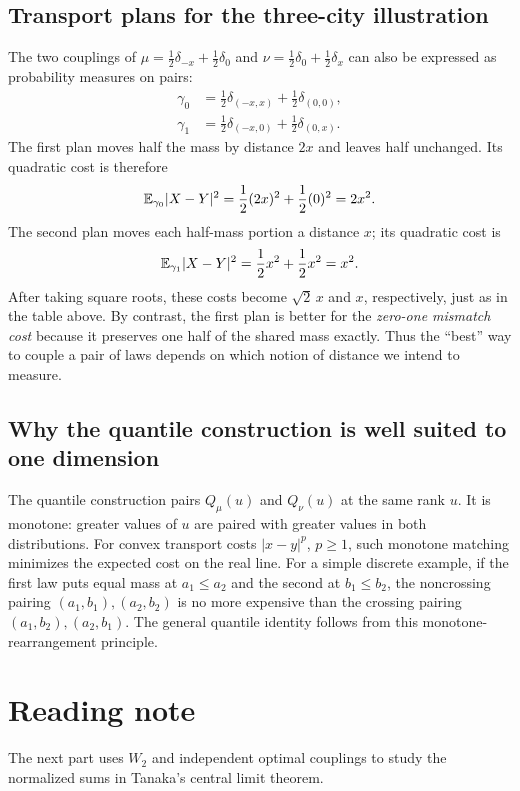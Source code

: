 \documentclass[10pt,a4paper]{article}
\begin{document}
\subsection*{Transport plans for the three-city illustration}
The two couplings of $\mu=\frac12\delta_{-x}+\frac12\delta_0$ and $\nu=\frac12\delta_0+\frac12\delta_x$ can also be expressed as probability measures on pairs:
\begin{align*}
\gamma_0&=\tfrac12\delta_{(-x,x)}+\tfrac12\delta_{(0,0)},\\
\gamma_1&=\tfrac12\delta_{(-x,0)}+\tfrac12\delta_{(0,x)}.
\end{align*}
The first plan moves half the mass by distance $2x$ and leaves half unchanged. Its quadratic cost is therefore
\[
\mathbb E_{\gamma_0}|X-Y|^2
=\frac12(2x)^2+\frac12(0)^2=2x^2.
\]
The second plan moves each half-mass portion a distance $x$; its quadratic cost is
\[
\mathbb E_{\gamma_1}|X-Y|^2
=\frac12x^2+\frac12x^2=x^2.
\]
After taking square roots, these costs become $\sqrt2\,x$ and $x$, respectively, just as in the table above. By contrast, the first plan is better for the \emph{zero-one mismatch cost} because it preserves one half of the shared mass exactly. Thus the ``best'' way to couple a pair of laws depends on which notion of distance we intend to measure.

\subsection*{Why the quantile construction is well suited to one dimension}
The quantile construction pairs $Q_\mu(u)$ and $Q_\nu(u)$ at the same rank $u$. It is monotone: greater values of $u$ are paired with greater values in both distributions. For convex transport costs $|x-y|^p$, $p\ge1$, such monotone matching minimizes the expected cost on the real line. For a simple discrete example, if the first law puts equal mass at $a_1\le a_2$ and the second at $b_1\le b_2$, the noncrossing pairing $(a_1,b_1),(a_2,b_2)$ is no more expensive than the crossing pairing $(a_1,b_2),(a_2,b_1)$. The general quantile identity follows from this monotone-rearrangement principle.

\section*{Reading note}
The next part uses $W_2$ and independent optimal couplings to study the normalized sums in Tanaka's central limit theorem.
\end{document}
